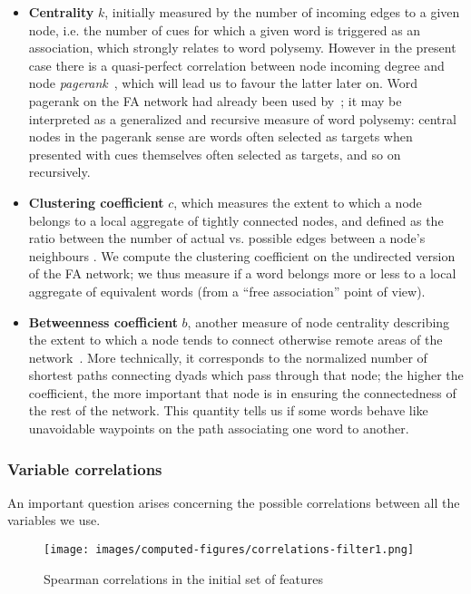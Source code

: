 \begin{itemize}
    \item \textbf{Centrality} $k$, initially measured by the number of incoming edges to a given node, i.e. the number of cues for which a given word is triggered as an association, which strongly relates to word polysemy.
    However in the present case there is a quasi-perfect correlation between node incoming degree and node \emph{pagerank}~\citep{Page99}, which will lead us to favour the latter later on. Word pagerank on the FA network had already been used by~\citet{Griffiths07}; it may be interpreted as a generalized and recursive measure of word polysemy: central nodes in the pagerank sense are words often selected as targets when presented with cues themselves often selected as targets, and so on recursively.
    \item \textbf{Clustering coefficient} $c$, which measures the extent to which a node belongs to a local aggregate of tightly connected nodes, and defined as the ratio between the number of actual vs. possible edges between a node's neighbours \cite{watt-coll}.
    We compute the clustering coefficient on the undirected version of the FA network; we thus measure if a word belongs more or less to a local aggregate of equivalent words (from a ``free association'' point of view).
    \item \textbf{Betweenness coefficient} $b$, another measure of node centrality describing the extent to which a node tends to connect otherwise remote areas of the network~\citep{free:set}.
    More technically, it corresponds to the normalized number of shortest paths connecting dyads which pass through that node; the higher the coefficient, the more important that node is in ensuring the connectedness of the rest of the network.
    This quantity tells us if some words behave like unavoidable waypoints on the path associating one word to another.
\end{itemize}

\subsubsection{Variable correlations}

An important question arises concerning the possible correlations between all the variables we use.

\begin{figure}[!th]
    \centering
    \texttt{[image: images/computed-figures/correlations-filter1.png]}
    \caption{Spearman correlations in the initial set of features}
    \label{fig:feature-corrs-initial}
\end{figure}

